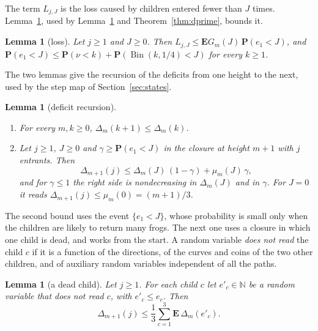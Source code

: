 \documentclass[11pt]{amsart}
\newtheorem{lemma}[theorem]{Lemma}
\theoremstyle{definition}
\numberwithin{equation}{section}
\newcommand{\lean}[1]{\ignorespaces}
\newcommand{\N}{\mathbb{N}}
\newcommand{\E}{\mathbf{E}}
\renewcommand{\P}{\mathbf{P}}
\newcommand{\Bin}{\operatorname{Bin}}
\begin{document}
The term $L_{j,J}$ is the loss caused by children entered fewer than $J$ times. Lemma~\ref{lem:loss}, used by Lemma~\ref{lem:deficit} and Theorem~\ref{thm:dprime}, bounds it.

\begin{lemma}[loss]\label{lem:loss}\lean{FrogModel.D3.Assembly.lemma8a_proof, FrogModel.D3.Iface.lemma8b_of, FrogModel.D3.Iface.lemma8a, FrogModel.D3.Iface.lemma8b}
Let $j\ge1$ and $J\ge0$. Then $L_{j,J}\le\E G_m(J)\,\P(e_1<J)$, and $\P(e_1<J)\le\P(\nu<k)+\P(\Bin(k,1/4)<J)$ for every $k\ge1$.
\end{lemma}

The two lemmas give the recursion of the deficits from one height to the next, used by the step map of Section~\ref{sec:states}.

\begin{lemma}[deficit recursion]\label{lem:deficit}\lean{FrogModel.D3.Assembly.lemma17b_proof, FrogModel.D3.Assembly.lemma17a_proof, FrogModel.D3.Iface.lemma17b, FrogModel.D3.Iface.lemma17a}
\begin{enumerate}
\item For every $m,k\ge0$, $\Delta_m(k+1)\le\Delta_m(k)$.
\item Let $j\ge1$, $J\ge0$ and $\gamma\ge\P(e_1<J)$ in the closure at height $m+1$ with $j$ entrants. Then
\[
\Delta_{m+1}(j)\le\Delta_m(J)\,(1-\gamma)+\mu_m(J)\,\gamma,
\]
and for $\gamma\le1$ the right side is nondecreasing in $\Delta_m(J)$ and in $\gamma$. For $J=0$ it reads $\Delta_{m+1}(j)\le\mu_m(0)=(m+1)/3$.
\end{enumerate}
\end{lemma}

The second bound uses the event $\{e_1<J\}$, whose probability is small only when the children are likely to return many frogs. The next one uses a closure in which one child is dead, and works from the start. A random variable \emph{does not read} the child $c$ if it is a function of the directions, of the curves and coins of the two other children, and of auxiliary random variables independent of all the paths.

\begin{lemma}[a dead child]\label{lem:deadchild}\lean{FrogModel.D3.Assembly.lemmaS2'_proof, FrogModel.D3.Iface.lemmaS2'}
Let $j\ge1$. For each child $c$ let $e'_c\in\N$ be a random variable that does not read $c$, with $e'_c\le e_c$. Then
\[
\Delta_{m+1}(j)\le\frac13\sum_{c=1}^3\E\,\Delta_m(e'_c).
\]
\end{lemma}
\end{document}
